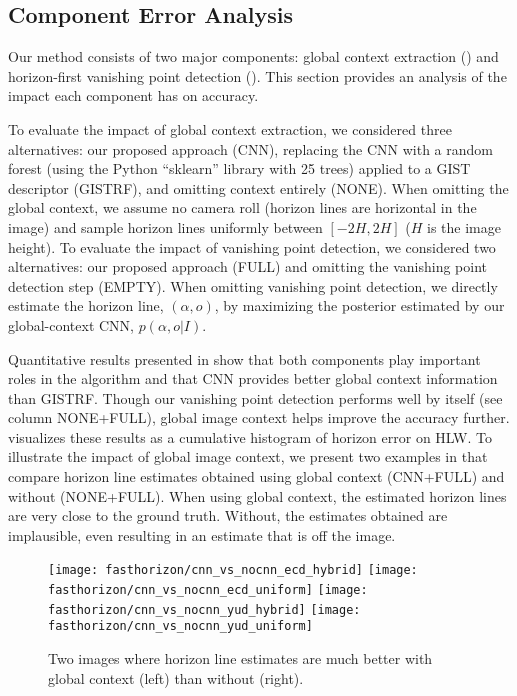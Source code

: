 \subsection{Component Error Analysis}
\label{sec:analysis}

Our method consists of two major components: global context extraction
() and horizon-first vanishing point detection
(). This section provides an analysis of the impact
each component has on accuracy. 

To evaluate the impact of global context extraction, we considered
three alternatives: our proposed approach (CNN), replacing the CNN
with a random forest (using the Python ``sklearn'' library with 25 trees) applied to a GIST~\cite{oliva2001modeling}
descriptor (GISTRF), and omitting context entirely
(NONE). When omitting the global context, we assume no camera
roll (horizon lines are horizontal in the image) and sample horizon
lines uniformly between $[-2H,2H]$ ($H$ is the image height).  To
evaluate the impact of vanishing point detection, we considered two
alternatives: our proposed approach (FULL) and omitting the vanishing
point detection step (EMPTY). When omitting vanishing point detection,
we directly estimate the horizon line, $(\alpha, o)$, by maximizing
the posterior estimated by our global-context CNN, $p(\alpha, o | I)$.

Quantitative results presented in  show that both
components play important roles in the algorithm and that CNN provides
better global context information than GISTRF.  Though our vanishing
point detection performs well by itself (see column NONE+FULL), global
image context helps improve the accuracy further. 
visualizes these results as a cumulative histogram of horizon error
on HLW.  To illustrate the impact of global image context, we present
two examples in  that compare horizon line
estimates obtained using global context (CNN+FULL) and without
(NONE+FULL).  When using global context, the estimated horizon lines
are very close to the ground truth.  Without, the estimates obtained
are implausible, even resulting in an estimate that is off the image.

\begin{figure}
  \centering
  \texttt{[image: fasthorizon/cnn\_vs\_nocnn\_ecd\_hybrid]}
  \texttt{[image: fasthorizon/cnn\_vs\_nocnn\_ecd\_uniform]}
  \texttt{[image: fasthorizon/cnn\_vs\_nocnn\_yud\_hybrid]}
  \texttt{[image: fasthorizon/cnn\_vs\_nocnn\_yud\_uniform]}
  \caption{Two images where horizon line estimates are much better with global context (left) than without (right).}
  \label{fig:iscontext}
\end{figure}

